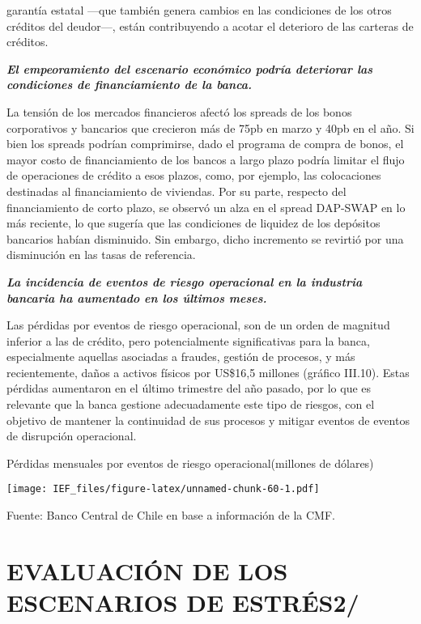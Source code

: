 \documentclass[
]{book}
\begin{document}
garantía estatal ---que también genera cambios en las condiciones de los otros
créditos del deudor---, están contribuyendo a acotar el deterioro de las carteras
de créditos.

\textbf{\emph{El empeoramiento del escenario económico podría deteriorar las condiciones de financiamiento de la banca.}}

La tensión de los mercados financieros afectó los spreads de los bonos
corporativos y bancarios que crecieron más de 75pb en marzo y 40pb en el
año. Si bien los spreads podrían comprimirse, dado el programa de compra de
bonos, el mayor costo de financiamiento de los bancos a largo plazo podría
limitar el flujo de operaciones de crédito a esos plazos, como, por ejemplo,
las colocaciones destinadas al financiamiento de viviendas. Por su parte,
respecto del financiamiento de corto plazo, se observó un alza en el spread
DAP-SWAP en lo más reciente, lo que sugería que las condiciones de liquidez
de los depósitos bancarios habían disminuido. Sin embargo, dicho incremento
se revirtió por una disminución en las tasas de referencia.

\textbf{\emph{La incidencia de eventos de riesgo operacional en la industria bancaria ha aumentado en los últimos meses.}}

Las pérdidas por eventos de riesgo operacional, son de un orden de magnitud
inferior a las de crédito, pero potencialmente significativas para la banca,
especialmente aquellas asociadas a fraudes, gestión de procesos, y más
recientemente, daños a activos físicos por US\$16,5 millones (gráfico III.10).
Estas pérdidas aumentaron en el último trimestre del año pasado, por lo que
es relevante que la banca gestione adecuadamente este tipo de riesgos, con
el objetivo de mantener la continuidad de sus procesos y mitigar eventos de
eventos de disrupción operacional.

Pérdidas mensuales por eventos de riesgo operacional(millones de dólares)

\texttt{[image: IEF\_files/figure-latex/unnamed-chunk-60-1.pdf]}

Fuente: Banco Central de Chile en base a información de la CMF.

\hypertarget{EES}{%
\section*{EVALUACIÓN DE LOS ESCENARIOS DE ESTRÉS2/}\label{EES}}
\end{document}
